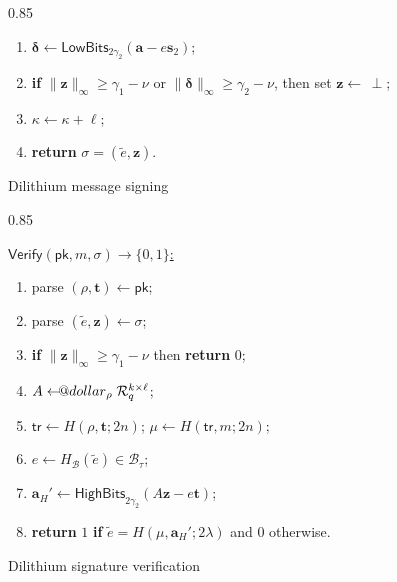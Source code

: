 \documentclass{template}
\makeatletter
\newcommand\leftarrowS{\leftarrow\joinrel\smalldollar}
\newcommand{\smalldollar}{\mathrel{\mathpalette\small@dollar\relax}}
\newcommand{\small@dollar}[2]{%
  \vcenter{\hbox{%
    $#1\textnormal{\fontsize{0.7\dimexpr\f@size pt}{0}\selectfont\$}$%
  }}%
}
\makeatother
\begin{document}
\begin{figure}[H]
\begin{varwidth}{0.85\linewidth}
\begin{mdframed}[linecolor=black, linewidth=1.0pt,
                     skipabove=5pt, skipbelow=5pt,
                     innerleftmargin=5pt, innerrightmargin=5pt]
\begin{enumerate}
        \item \hspace{20px} $\bm{\delta} \gets \mathsf{LowBits}_{2\gamma_2}(\mathbf{a} - e\mathbf{s}_2)$;
        \item \hspace{20px} \textbf{if} $\|\mathbf{z}\|_{\infty} \geq \gamma_1-\nu$ or $\|\bm{\delta}\|_{\infty} \geq \gamma_2-\nu$, then set $\mathbf{z} \gets \,\perp$;
        \item \hspace{20px} $\kappa \gets \kappa+\ell$;
        \item \textbf{return} $\sigma=(\widetilde{e}, \mathbf{z})$.
    \end{enumerate}
\end{mdframed}
\end{varwidth}
\caption{Dilithium message signing}
\label{fig:delithium-sign}
\end{figure}
\begin{figure}[H]
\centering
\begin{varwidth}{0.85\linewidth}
\begin{mdframed}[linecolor=black, linewidth=1.0pt,
                     skipabove=5pt, skipbelow=5pt,
                     innerleftmargin=5pt, innerrightmargin=5pt]
    \centering
    \colorbox{green!10}{\underline{$\mathsf{Verify}(\mathsf{pk},m,\sigma) \to \{0,1\}$:}}
    \begin{enumerate}
        \item parse $(\rho,\mathbf{t}) \gets \mathsf{pk}$;
        \item parse $(\widetilde{e},\mathbf{z}) \gets \sigma$;
        \item \textbf{if} $\|\mathbf{z}\|_{\infty} \geq \gamma_1-\nu$ then \textbf{return} 0;
        \item $A \leftarrowS_{\rho} \mathcal{R}_q^{k \times \ell}$;
        \item $\mathsf{tr} \gets H(\rho,\mathbf{t};2n)$; $\mu \gets H(\mathsf{tr},m;2n)$;
        \item $e \gets H_{\mathcal{B}}(\widetilde{e}) \in \mathcal{B}_{\tau}$;
        \item $\mathbf{a}_H' \gets \mathsf{HighBits}_{2\gamma_2}(A\mathbf{z}-e\mathbf{t})$;
        \item \textbf{return} $1$ \textbf{if} $\widetilde{e} = H(\mu,\mathbf{a}_H';2\lambda)$ and $0$ otherwise.
    \end{enumerate}
\end{mdframed}
\end{varwidth}
\caption{Dilithium signature verification}
\label{fig:delithium-verify}
\end{figure}
\end{document}
